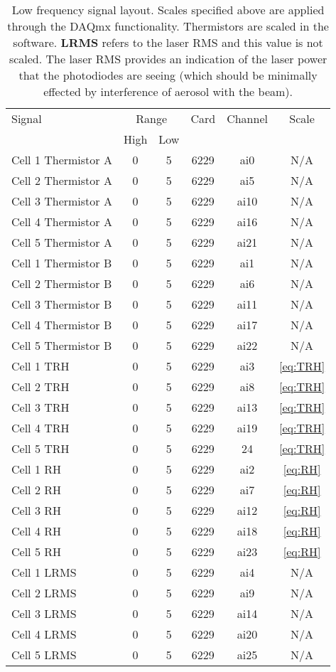 \documentclass[10pt,twocolumn, twoside, openright]{article}
\begin{document}
\begin{table*}[tb]
	\begin{tabular}{lccccc}
	\hline
	Signal & \multicolumn{2}{c}{Range} & Card & Channel & Scale\\
		& High & Low &&&\\
	\hline\hline
	Cell 1 Thermistor A & 0 & 5 & 6229 & ai0 & N/A\\
	Cell 2 Thermistor A & 0 & 5 & 6229 & ai5 & N/A\\
	Cell 3 Thermistor A & 0 & 5 & 6229 & ai10 & N/A\\
	Cell 4 Thermistor A & 0 & 5 & 6229 & ai16 & N/A\\
	Cell 5 Thermistor A & 0 & 5 & 6229 & ai21 & N/A\\
	Cell 1 Thermistor B & 0 & 5 & 6229 & ai1 & N/A\\
	Cell 2 Thermistor B & 0 & 5 & 6229 & ai6 & N/A\\
	Cell 3 Thermistor B & 0 & 5 & 6229 & ai11 & N/A\\
	Cell 4 Thermistor B & 0 & 5 & 6229 & ai17 & N/A\\
	Cell 5 Thermistor B & 0 & 5 & 6229 & ai22 & N/A\\
	Cell 1 TRH & 0 & 5 & 6229 & ai3 & \ref{eq:TRH}\\
	Cell 2 TRH & 0 & 5 & 6229 & ai8 & \ref{eq:TRH}\\
	Cell 3 TRH & 0 & 5 & 6229 & ai13 & \ref{eq:TRH}\\
	Cell 4 TRH & 0 & 5 & 6229 & ai19 & \ref{eq:TRH}\\
	Cell 5 TRH & 0 & 5 & 6229 & 24 & \ref{eq:TRH}\\
	Cell 1 RH & 0 & 5 & 6229 & ai2 & \ref{eq:RH}\\
	Cell 2 RH & 0 & 5 & 6229 & ai7 & \ref{eq:RH}\\
	Cell 3 RH & 0 & 5 & 6229 & ai12 & \ref{eq:RH}\\
	Cell 4 RH & 0 & 5 & 6229 & ai18 & \ref{eq:RH}\\
	Cell 5 RH & 0 & 5 & 6229 & ai23 & \ref{eq:RH}\\
	Cell 1 LRMS & 0 & 5 & 6229 & ai4 & N/A\\
	Cell 2 LRMS & 0 & 5 & 6229 & ai9 & N/A\\
	Cell 3 LRMS & 0 & 5 & 6229 & ai14 & N/A\\
	Cell 4 LRMS & 0 & 5 & 6229 & ai20 & N/A\\
	Cell 5 LRMS & 0 & 5 & 6229 & ai25 & N/A\\
	\hline
	\end{tabular}
	\caption{Low frequency signal layout.  Scales specified above are applied through the DAQmx functionality.  Thermistors are scaled in the software.  \textbf{LRMS} refers to the laser RMS and this value is not scaled.  The laser RMS provides an indication of the laser power that the photodiodes are seeing (which should be minimally effected by interference of aerosol with the beam).}
	\label{tab:LFSig}
\end{table*}
%
\end{document}
